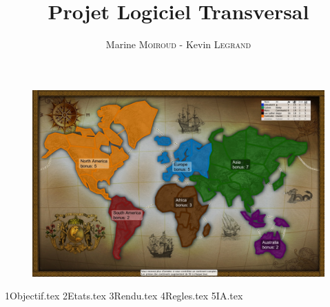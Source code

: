 \documentclass[12pt]{article}
\title{\textbf{\huge Projet Logiciel Transversal}}
\author{Marine \textsc{Moiroud} - Kevin \textsc{Legrand}}
\newcommand*{\sourcedir}{Sources/}
\begin{document}
    
    \maketitle 
     \begin{figure}[!htbp]
        \centering
        \includegraphics[width=15cm]{Images/risk.jpg}
    \end{figure}
    \newpage
    \newpage
    \tableofcontents
    \newpage
    
    {1Objectif.tex}
    \newpage
    {2Etats.tex}
    \newpage
    {3Rendu.tex}
    \newpage
    {4Regles.tex}
    \newpage
    {5IA.tex}
    \newpage
    
\end{document}
